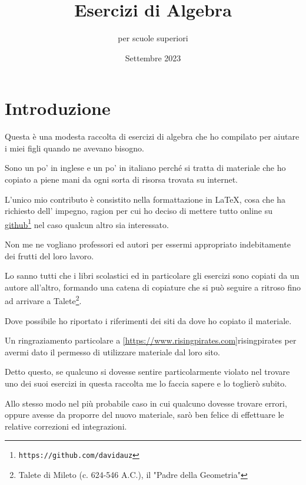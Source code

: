 \documentclass[a4paper,14pt]{extarticle}
\title{Esercizi di Algebra}
\author{per scuole superiori}
\date{Settembre 2023}
\begin{document}
\maketitle
\tableofcontents
\newpage

\section{Introduzione}

Questa è una modesta raccolta di esercizi di algebra che ho compilato per aiutare i
miei figli quando ne avevano bisogno.

Sono un po' in inglese e un po' in italiano perché
si tratta di materiale che ho copiato a piene mani da ogni sorta di risorsa trovata su internet.

L'unico mio contributo è consistito nella formattazione in  \LaTeX, cosa che ha richiesto 
dell' impegno, ragion per cui ho deciso di mettere tutto online su \href{https://github.com/davidauz}{github}\footnote{\texttt{https://github.com/davidauz}}
nel caso qualcun altro sia interessato.

Non me ne vogliano professori ed autori per essermi appropriato indebitamente dei frutti del loro lavoro.

Lo sanno tutti che i libri scolastici ed in particolare gli esercizi sono copiati da un autore all'altro,
formando una catena di copiature che si può seguire a ritroso fino ad arrivare a 
Talete\footnote{Talete di Mileto (c. 624-546 A.C.), il "Padre della Geometria"}.

Dove possibile ho riportato i riferimenti dei siti da dove ho copiato il materiale.

Un ringraziamento particolare a \ref{https://www.risingpirates.com}{risingpirates} per avermi dato il permesso di
utilizzare materiale dal loro sito.

Detto questo, se qualcuno si dovesse sentire particolarmente violato nel trovare uno dei suoi esercizi in 
questa raccolta me lo faccia sapere e lo toglierò subito.

Allo stesso modo nel più probabile caso in cui qualcuno dovesse trovare errori, oppure avesse da proporre del 
nuovo materiale, sarò ben felice di effettuare le relative correzioni ed integrazioni.










\end{document}
